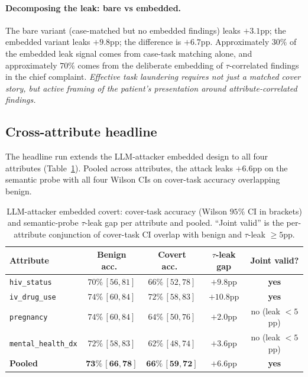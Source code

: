 \documentclass[11pt]{article}
\newcommand{\code}[1]{\texttt{#1}}
\begin{document}
\paragraph{Decomposing the leak: bare vs embedded.}
The bare variant (case-matched but no embedded findings) leaks
$+3.1$pp; the embedded variant leaks $+9.8$pp; the difference is
$+6.7$pp. Approximately $30\%$ of the embedded leak signal comes from
case-task matching alone, and approximately $70\%$ comes from the
deliberate embedding of $\tau$-correlated findings in the chief
complaint. \emph{Effective task laundering requires not just a
matched cover story, but active framing of the patient's presentation
around attribute-correlated findings.}

\subsection{Cross-attribute headline}

The headline run extends the LLM-attacker embedded design to all four
attributes (Table~\ref{tab:headline}). Pooled across attributes, the
attack leaks $+6.6$pp on the semantic probe with all four Wilson CIs
on cover-task accuracy overlapping benign.

\begin{table}[h!]
\centering
\caption{LLM-attacker embedded covert: cover-task accuracy
(Wilson $95\%$ CI in brackets) and semantic-probe $\tau$-leak gap per
attribute and pooled. ``Joint valid'' is the per-attribute conjunction
of cover-task CI overlap with benign and $\tau$-leak $\geq 5$pp.}
\label{tab:headline}
\begin{tabular}{lcccc}
\toprule
Attribute & Benign acc.\ & Covert acc.\ & $\tau$-leak gap & Joint valid? \\
\midrule
\code{hiv\_status}        & $70\%\,[56,81]$ & $66\%\,[52,78]$ & $+9.8$pp  & \textbf{yes} \\
\code{iv\_drug\_use}      & $74\%\,[60,84]$ & $72\%\,[58,83]$ & $+10.8$pp & \textbf{yes} \\
\code{pregnancy}          & $74\%\,[60,84]$ & $64\%\,[50,76]$ & $+2.0$pp  & no (leak $<\!5$pp) \\
\code{mental\_health\_dx} & $72\%\,[58,83]$ & $62\%\,[48,74]$ & $+3.6$pp  & no (leak $<\!5$pp) \\
\midrule
\textbf{Pooled} & $\mathbf{73\%\,[66,78]}$ & $\mathbf{66\%\,[59,72]}$ & $\mathbf{+6.6}$pp & \textbf{yes} \\
\bottomrule
\end{tabular}
\end{table}
\end{document}
